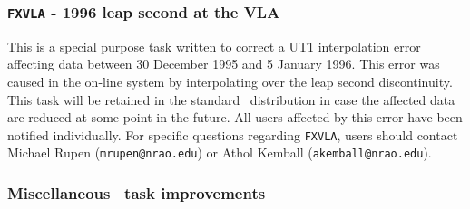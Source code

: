 \subsubsection{{\tt FXVLA} - 1996 leap second at the VLA}

This is a special purpose task written to correct a UT1 interpolation
error affecting data between 30 December 1995 and 5 January 1996. This
error was caused in the on-line system by interpolating over the leap
second discontinuity. This task will be retained in the standard
\AIPS\ distribution in case the affected data are reduced at some
point in the future. All users affected by this error have been
notified individually. For specific questions regarding {\tt FXVLA},
users should contact Michael Rupen ({\tt mrupen@nrao.edu}) or Athol
Kemball ({\tt akemball@nrao.edu}).


\subsubsection{Miscellaneous \uv\ task improvements}

